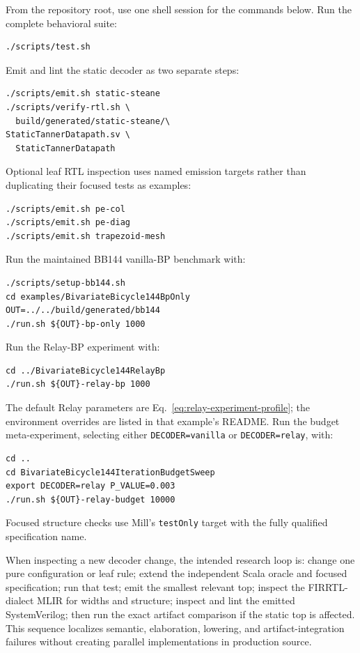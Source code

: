 \documentclass[10pt,conference]{IEEEtran}
\begin{document}
From the repository root, use one shell session for the commands below.  Run
the complete behavioral suite:
\begin{verbatim}
./scripts/test.sh
\end{verbatim}
Emit and lint the static decoder as two separate steps:
\begin{verbatim}
./scripts/emit.sh static-steane
./scripts/verify-rtl.sh \
  build/generated/static-steane/\
StaticTannerDatapath.sv \
  StaticTannerDatapath
\end{verbatim}
Optional leaf RTL inspection uses named emission targets rather than
duplicating their focused tests as examples:
\begin{verbatim}
./scripts/emit.sh pe-col
./scripts/emit.sh pe-diag
./scripts/emit.sh trapezoid-mesh
\end{verbatim}
Run the maintained BB144 vanilla-BP benchmark with:
\begin{verbatim}
./scripts/setup-bb144.sh
cd examples/BivariateBicycle144BpOnly
OUT=../../build/generated/bb144
./run.sh ${OUT}-bp-only 1000
\end{verbatim}
Run the Relay-BP experiment with:
\begin{verbatim}
cd ../BivariateBicycle144RelayBp
./run.sh ${OUT}-relay-bp 1000
\end{verbatim}
The default Relay parameters are Eq.~\eqref{eq:relay-experiment-profile}; the
environment overrides are listed in that example's README.  Run the budget
meta-experiment, selecting either \texttt{DECODER=vanilla} or
\texttt{DECODER=relay}, with:
\begin{verbatim}
cd ..
cd BivariateBicycle144IterationBudgetSweep
export DECODER=relay P_VALUE=0.003
./run.sh ${OUT}-relay-budget 10000
\end{verbatim}
Focused structure checks use Mill's \texttt{testOnly} target with the fully
qualified specification name.

When inspecting a new decoder change, the intended research loop is: change
one pure configuration or leaf rule; extend the independent Scala oracle and
focused specification; run that test; emit the smallest relevant top; inspect
the FIRRTL-dialect MLIR for widths and structure; inspect and lint the emitted
SystemVerilog; then run the exact artifact comparison if the static top is
affected.  This sequence localizes semantic, elaboration, lowering, and
artifact-integration failures without creating parallel implementations in
production source.
\end{document}
